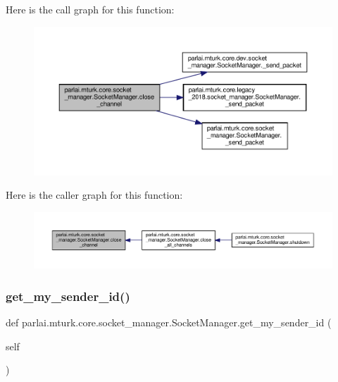 Here is the call graph for this function\+:
\nopagebreak
\begin{figure}[H]
\begin{center}
\leavevmode
\includegraphics[width=350pt]{classparlai_1_1mturk_1_1core_1_1socket__manager_1_1SocketManager_ae079bc95ebedcab4e52325253db490cf_cgraph}
\end{center}
\end{figure}
Here is the caller graph for this function\+:
\nopagebreak
\begin{figure}[H]
\begin{center}
\leavevmode
\includegraphics[width=350pt]{classparlai_1_1mturk_1_1core_1_1socket__manager_1_1SocketManager_ae079bc95ebedcab4e52325253db490cf_icgraph}
\end{center}
\end{figure}
\mbox{\label{classparlai_1_1mturk_1_1core_1_1socket__manager_1_1SocketManager_a17a6ebab4a3c0e2882ba01398f2e9df1}} 
\subsubsection{\texorpdfstring{get\+\_\+my\+\_\+sender\+\_\+id()}{get\_my\_sender\_id()}}
{\footnotesize\ttfamily def parlai.\+mturk.\+core.\+socket\+\_\+manager.\+Socket\+Manager.\+get\+\_\+my\+\_\+sender\+\_\+id (\begin{DoxyParamCaption}\item[{}]{self }\end{DoxyParamCaption})}

